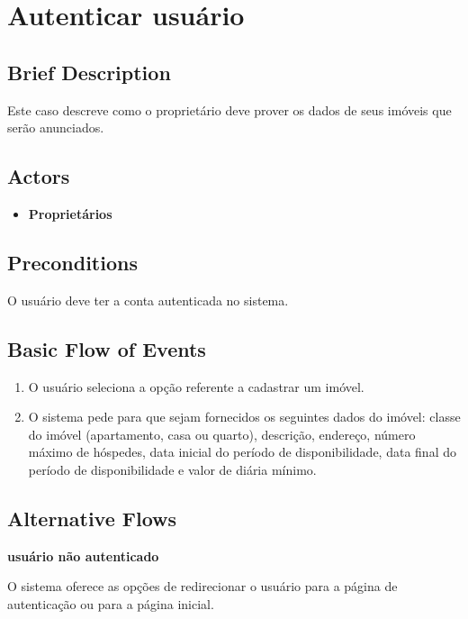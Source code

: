 \section{Autenticar usuário}

\subsection*{Brief Description}
Este caso descreve como o proprietário deve prover os dados de seus imóveis que serão
anunciados.

\subsection*{Actors}

\begin{itemize}
    \item \textbf{Proprietários}
\end{itemize}

\subsection*{Preconditions}
O usuário deve ter a conta autenticada no sistema.

\subsection*{Basic Flow of Events}

\begin{enumerate}
    \item O usuário seleciona a opção referente a cadastrar um imóvel.
    \item O sistema pede para que sejam fornecidos os seguintes dados do imóvel: classe do imóvel
    (apartamento, casa ou quarto), descrição, endereço, número máximo de hóspedes, data inicial do
    período de disponibilidade, data final do período de disponibilidade e valor de diária mínimo.
\end{enumerate}

\subsection*{Alternative Flows}

\textbf{usuário não autenticado}

O sistema oferece as opções de redirecionar o usuário para a página de autenticação ou para a
página inicial.

